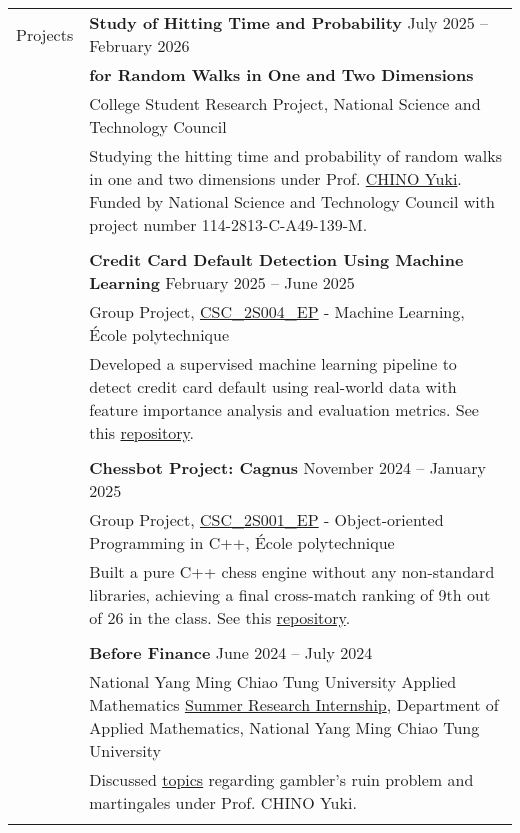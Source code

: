 \documentclass[letterpaper, 11pt]{article}
\begin{document}
\begin{center}
\begin{longtable}{p{0.76in}p{5.93in}}

        {\textcolor{OliveGreen}{Projects}} & \textbf{Study of Hitting Time and Probability} \hfill July 2025 -- February 2026\\
        & \textbf{\quad \quad \quad for Random Walks in One and Two Dimensions} \\
        & College Student Research Project, National Science and Technology Council\\
        & Studying the hitting time and probability of random walks in one and two dimensions under Prof. \href{https://scholar.nycu.edu.tw/en/persons/yuki-chino}{CHINO Yuki}. Funded by National Science and Technology Council with project number 114-2813-C-A49-139-M.\\
        & \\
        

        & \textbf{Credit Card Default Detection Using Machine Learning} \hfill February 2025 -- June 2025\\
        & Group Project, \href{https://synapses.polytechnique.fr/catalogue/2024-2025/ue/47/CSC-2S004-EP-machine-learning?from=D12}{CSC\_2S004\_EP} - Machine Learning, École polytechnique\\
        & Developed a supervised machine learning pipeline to detect credit card default using real-world data with feature importance analysis and evaluation metrics. See this \href{https://github.com/eiken59/ml_project/blob/main/README.md}{repository}.\\
        & \\

        & \textbf{Chessbot Project: Cagnus} \hfill November 2024 -- January 2025\\
        & Group Project, \href{https://synapses.polytechnique.fr/catalogue/2024-2025/ue/32/CSC-2F001-EP-object-oriented-programming-in-c?from=D12}{CSC\_2S001\_EP} - Object-oriented Programming in C++, École polytechnique\\
        & Built a pure C++ chess engine without any non-standard libraries, achieving a final cross-match ranking of 9th out of 26 in the class. See this \href{https://github.com/jetzypetz/chess_bot/blob/main/docs/README.md}{repository}.\\
        & \\
        
        & \textbf{Before Finance} \hfill June 2024 -- July 2024\\
        & National Yang Ming Chiao Tung University Applied Mathematics \href{https://teshenglin.github.io/courses/2024_summer_research/}{Summer Research Internship}, Department of Applied Mathematics, National Yang Ming Chiao Tung University\\
        & Discussed \href{https://hackmd.io/@eiken-sc11/B1QcaW3B0}{topics} regarding gambler's ruin problem and martingales under Prof. CHINO Yuki.\\
        & \\
        


\end{longtable}
\end{center}
\end{document}
